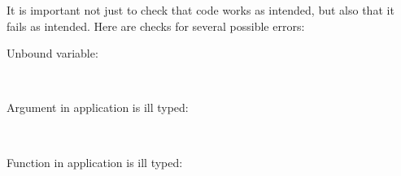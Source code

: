 It is important not just to check that code works as intended, but also
that it fails as intended. Here are checks for several possible errors:

Unbound variable:

\begin{fence}
\begin{code}%
\>[0]\AgdaFunction{\AgdaUnderscore{}}\AgdaSpace{}%
\AgdaSymbol{:}\AgdaSpace{}%
\AgdaSpace{}%
\AgdaSpace{}%
\AgdaSymbol{((}\AgdaSpace{}%
\AgdaSpace{}%
\AgdaSpace{}%
\AgdaSpace{}%
\AgdaSpace{}%
\AgdaSymbol{)}\AgdaSpace{}%
\AgdaSpace{}%
\AgdaSymbol{(}\AgdaSpace{}%
\AgdaSpace{}%
\AgdaSymbol{))}\AgdaSpace{}%
\AgdaSpace{}%
\AgdaSpace{}%
\AgdaSymbol{\AgdaUnderscore{}}\<%
\\
\>[0]\AgdaSymbol{\AgdaUnderscore{}}\AgdaSpace{}%
\AgdaSymbol{=}\AgdaSpace{}%
\<%
\end{code}
\end{fence}

Argument in application is ill typed:

\begin{fence}
\begin{code}%
\>[0]\AgdaFunction{\AgdaUnderscore{}}\AgdaSpace{}%
\AgdaSymbol{:}\AgdaSpace{}%
\AgdaSpace{}%
\AgdaSpace{}%
\AgdaSymbol{(}\AgdaSpace{}%
\AgdaSpace{}%
\AgdaSymbol{)}\AgdaSpace{}%
\AgdaSpace{}%
\AgdaSpace{}%
\AgdaSymbol{\AgdaUnderscore{}}\<%
\\
\>[0]\AgdaSymbol{\AgdaUnderscore{}}\AgdaSpace{}%
\AgdaSymbol{=}\AgdaSpace{}%
\<%
\end{code}
\end{fence}

Function in application is ill typed:

